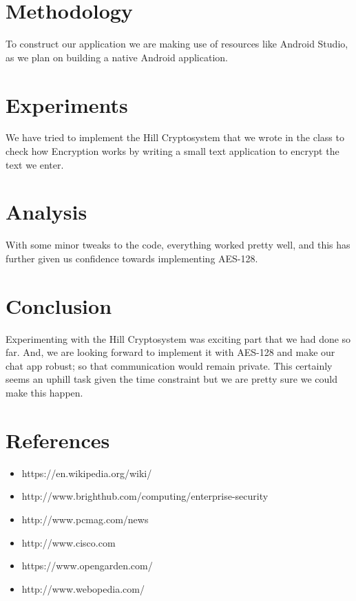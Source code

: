 \documentclass{article}
\begin{document}
\section{Methodology}
To construct our application we are making use of resources like Android Studio, as we plan on building a native Android application. 

\section{Experiments}
We have tried to implement the Hill Cryptosystem that we wrote in the class to check how Encryption works by writing a small text application to encrypt the text we enter. 

\section{Analysis}
With some minor tweaks to the code, everything worked pretty well, and this has further given us confidence towards implementing AES-128.  

\section{Conclusion}
Experimenting with the Hill Cryptosystem was exciting part that we had done so far. And, we are looking forward to implement it with AES-128 and make our chat app robust; so that communication would remain private. This certainly seems an uphill task given the time constraint but we are pretty sure we could make this happen.

\section{References}
\begin{itemize}
    \item https://en.wikipedia.org/wiki/
    \item http://www.brighthub.com/computing/enterprise-security
    \item http://www.pcmag.com/news
    \item http://www.cisco.com
    \item https://www.opengarden.com/
    \item http://www.webopedia.com/
\end{itemize}
\end{document}
